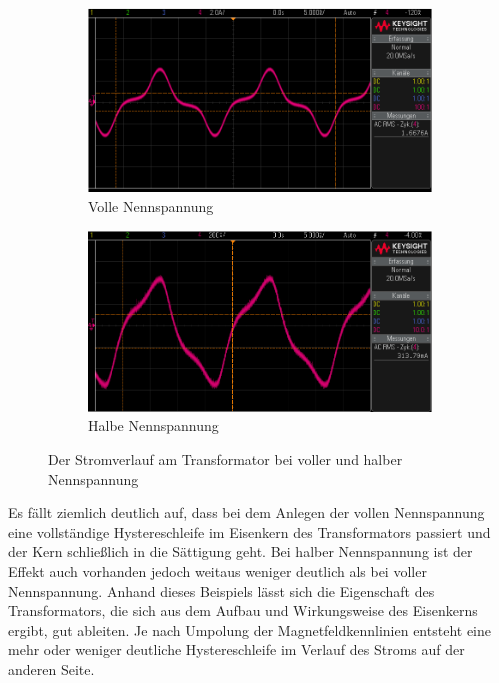 \documentclass{article}
\begin{document}
\begin{figure}[h]
  \centering
  \begin{subfigure}{.45\textwidth}
    \centering
    \includegraphics[width=\linewidth]{../assets/images/gep3/trafostrom_voll.png}
    \caption{Volle Nennspannung}
  \end{subfigure}
  \begin{subfigure}{.45\textwidth}
    \centering
    \includegraphics[width=\linewidth]{../assets/images/gep3/trafostrom_halb.png}
    \caption{Halbe Nennspannung}
  \end{subfigure}
  \label{fig:31_242}
  \caption{Der Stromverlauf am Transformator bei voller und halber Nennspannung}
\end{figure}

Es fällt ziemlich deutlich auf, dass bei dem Anlegen der vollen Nennspannung eine vollständige Hystereschleife im Eisenkern des Transformators passiert und der Kern schließlich in die Sättigung geht. Bei halber Nennspannung ist der Effekt auch vorhanden jedoch weitaus weniger deutlich als bei voller Nennspannung. Anhand dieses Beispiels lässt sich die Eigenschaft des Transformators, die sich aus dem Aufbau und Wirkungsweise des Eisenkerns ergibt, gut ableiten. Je nach Umpolung der Magnetfeldkennlinien entsteht eine mehr oder weniger deutliche Hystereschleife im Verlauf des Stroms auf der anderen Seite.
\newpage
\end{document}

